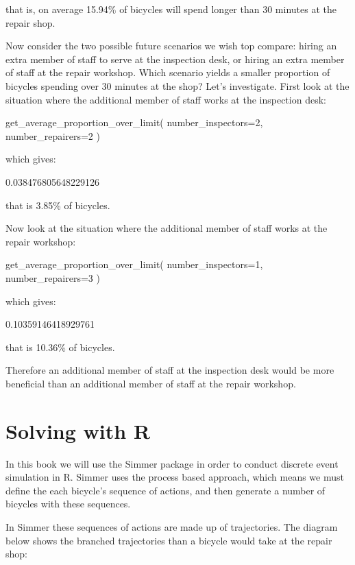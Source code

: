 that is, on average 15.94\% of bicycles will spend longer than 30 minutes at the
repair shop.

Now consider the two possible future scenarios we wish top compare: hiring an
extra member of staff to serve at the inspection desk, or hiring an extra member
of staff at the repair workshop. Which scenario yields a smaller proportion of
bicycles spending over 30 minutes at the shop? Let's investigate. First look at
the situation where the additional member of staff works at the inspection desk:

\begin{pyin}
get_average_proportion_over_limit(
    number_inspectors=2, number_repairers=2
)
\end{pyin}

which gives:

\begin{pyout}
0.038476805648229126
\end{pyout}

that is 3.85\% of bicycles.

Now look at the situation where the additional member of staff works at the
repair workshop:

\begin{pyin}
get_average_proportion_over_limit(
    number_inspectors=1, number_repairers=3
)
\end{pyin}

which gives:

\begin{pyout}
0.10359146418929761
\end{pyout}

that is 10.36\% of bicycles.

Therefore an additional member of staff at the inspection desk would be more
beneficial than an additional member of staff at the repair workshop.


\section{Solving with R}\label{sec:solving-with-R}

In this book we will use the Simmer package in order to conduct discrete event
simulation in R.
Simmer uses the process based approach, which means we must define the each
bicycle's sequence of actions, and then generate a number of bicycles with these
sequences.

In Simmer these sequences of actions are made up of trajectories. The
diagram below shows the branched trajectories than a bicycle would take at the
repair shop:

